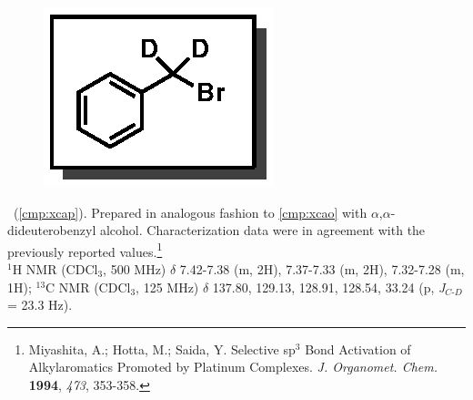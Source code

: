 \vspace{10pt}
\begin{figure}
  \vspace{-25pt}
  \begin{center}
    \includegraphics[scale=0.8]{chp_alkylation/images/xcap}
  \end{center}
  \vspace{-30pt}
\end{figure}
\noindent \textbf{\CMPxcap}\ (\ref{cmp:xcap}). Prepared in analogous fashion to \ref{cmp:xcao} with
$\alpha$,$\alpha$-dideuterobenzyl alcohol.
Characterization data were in agreement with the previously reported
values.\footnote{{\frenchspacing Miyashita, A.; Hotta, M.; Saida, Y. Selective sp$^3$  Bond Activation of Alkylaromatics
Promoted by Platinum Complexes. \textit{J. Organomet. Chem.} \textbf{1994}, \textit{473}, 353-358.}} \\
$^1$H NMR (CDCl$_3$, 500 MHz) $\delta$ 7.42-7.38 (m, 2H), 7.37-7.33 (m, 2H), 7.32-7.28 (m, 1H); 
$^{13}$C NMR (CDCl$_3$, 125 MHz) $\delta$ 137.80, 129.13, 128.91, 128.54, 33.24 (p,
\textit{J}$_{C\mbox{-}D}$ = 23.3 Hz).

